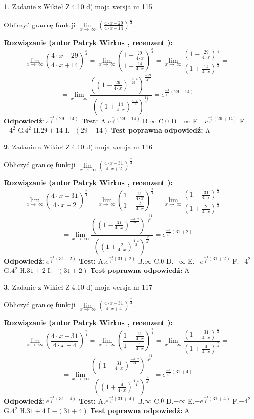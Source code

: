 \documentclass[12pt, a4paper]{article}
\theoremstyle{definition} %
\newtheorem{zad}{}
\newcommand{\zadStart}[1]{\begin{zad}#1\newline}
\newcommand{\zadStop}{\end{zad}}
\newcommand{\rozwStart}[2]{\noindent \textbf{Rozwiązanie (autor #1 , recenzent #2): }\newline}
\newcommand{\rozwStop}{\newline}
\newcommand{\odpStart}{\noindent \textbf{Odpowiedź:}\newline}
\newcommand{\odpStop}{\newline}
\newcommand{\testStart}{\noindent \textbf{Test:}\newline}
\newcommand{\testStop}{\newline}
\newcommand{\kluczStart}{\noindent \textbf{Test poprawna odpowiedź:}\newline}
\newcommand{\kluczStop}{\newline}
\begin{document}
\zadStart{Zadanie z Wikieł Z 4.10 d) moja wersja nr 115}


Obliczyć granicę funkcji  $\lim\limits_{x\to\ \infty}(\frac{4\cdot x-29}{4\cdot x+14})^{\frac{x}{4}}$.
\zadStop
\rozwStart{Patryk Wirkus}{}
$$\lim\limits_{x\to\ \infty}(\frac{4\cdot x-29}{4\cdot x+14})^{\frac{x}{4}} = \lim\limits_{x\to\ \infty}(\frac{1-\frac{29}{4\cdot x}}{1+\frac{14}{4\cdot x}})^{\frac{x}{4}}=\lim\limits_{x\to\ \infty}\frac{(1-\frac{29}{4\cdot x})^{\frac{x}{4}}}{(1+\frac{14}{4\cdot x})^{\frac{x}{4}}}=$$
$$=\lim\limits_{x\to\ \infty}\frac{((1-\frac{29}{4\cdot x})^{\frac{-4\cdot x}{29}})^{\frac{-29}{4^{2}}}}{((1+\frac{14}{4\cdot x})^{\frac{4\cdot x}{14}})^{\frac{14}{4^{2}}}}=e^{\frac{-1}{4^{2}}(29+14)}$$
\rozwStop
\odpStart
$e^{\frac{-1}{4^{2}}(29+14)}$
\odpStop
\testStart
A.$e^{\frac{-1}{4^{2}}(29+14)}$ B.$\infty$ C.$0$ D.$-\infty$ E.$-e^{\frac{-1}{4^{2}}(29+14)}$
F.$-4^{2}$ G.$4^{2}$
H.$29+14$
I.$-(29+14)$
\testStop
\kluczStart
A
\kluczStop



\zadStart{Zadanie z Wikieł Z 4.10 d) moja wersja nr 116}


Obliczyć granicę funkcji  $\lim\limits_{x\to\ \infty}(\frac{4\cdot x-31}{4\cdot x+2})^{\frac{x}{4}}$.
\zadStop
\rozwStart{Patryk Wirkus}{}
$$\lim\limits_{x\to\ \infty}(\frac{4\cdot x-31}{4\cdot x+2})^{\frac{x}{4}} = \lim\limits_{x\to\ \infty}(\frac{1-\frac{31}{4\cdot x}}{1+\frac{2}{4\cdot x}})^{\frac{x}{4}}=\lim\limits_{x\to\ \infty}\frac{(1-\frac{31}{4\cdot x})^{\frac{x}{4}}}{(1+\frac{2}{4\cdot x})^{\frac{x}{4}}}=$$
$$=\lim\limits_{x\to\ \infty}\frac{((1-\frac{31}{4\cdot x})^{\frac{-4\cdot x}{31}})^{\frac{-31}{4^{2}}}}{((1+\frac{2}{4\cdot x})^{\frac{4\cdot x}{2}})^{\frac{2}{4^{2}}}}=e^{\frac{-1}{4^{2}}(31+2)}$$
\rozwStop
\odpStart
$e^{\frac{-1}{4^{2}}(31+2)}$
\odpStop
\testStart
A.$e^{\frac{-1}{4^{2}}(31+2)}$ B.$\infty$ C.$0$ D.$-\infty$ E.$-e^{\frac{-1}{4^{2}}(31+2)}$
F.$-4^{2}$ G.$4^{2}$
H.$31+2$
I.$-(31+2)$
\testStop
\kluczStart
A
\kluczStop



\zadStart{Zadanie z Wikieł Z 4.10 d) moja wersja nr 117}


Obliczyć granicę funkcji  $\lim\limits_{x\to\ \infty}(\frac{4\cdot x-31}{4\cdot x+4})^{\frac{x}{4}}$.
\zadStop
\rozwStart{Patryk Wirkus}{}
$$\lim\limits_{x\to\ \infty}(\frac{4\cdot x-31}{4\cdot x+4})^{\frac{x}{4}} = \lim\limits_{x\to\ \infty}(\frac{1-\frac{31}{4\cdot x}}{1+\frac{4}{4\cdot x}})^{\frac{x}{4}}=\lim\limits_{x\to\ \infty}\frac{(1-\frac{31}{4\cdot x})^{\frac{x}{4}}}{(1+\frac{4}{4\cdot x})^{\frac{x}{4}}}=$$
$$=\lim\limits_{x\to\ \infty}\frac{((1-\frac{31}{4\cdot x})^{\frac{-4\cdot x}{31}})^{\frac{-31}{4^{2}}}}{((1+\frac{4}{4\cdot x})^{\frac{4\cdot x}{4}})^{\frac{4}{4^{2}}}}=e^{\frac{-1}{4^{2}}(31+4)}$$
\rozwStop
\odpStart
$e^{\frac{-1}{4^{2}}(31+4)}$
\odpStop
\testStart
A.$e^{\frac{-1}{4^{2}}(31+4)}$ B.$\infty$ C.$0$ D.$-\infty$ E.$-e^{\frac{-1}{4^{2}}(31+4)}$
F.$-4^{2}$ G.$4^{2}$
H.$31+4$
I.$-(31+4)$
\testStop
\kluczStart
A
\kluczStop
\end{document}

